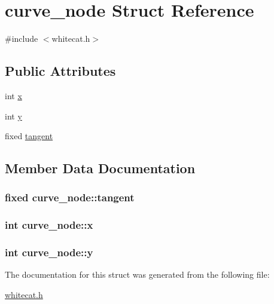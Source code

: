 \hypertarget{structcurve__node}{\section{curve\-\_\-node Struct Reference}
\label{structcurve__node}
}


{\ttfamily \#include $<$whitecat.\-h$>$}

\subsection*{Public Attributes}
\begin{DoxyCompactItemize}
\item 
int \hyperlink{structcurve__node_aa7ae8f2ee3bbd3e6194785c392751cdb}{x}
\item 
int \hyperlink{structcurve__node_afc1f4f007a920aa79c1f1f0ff0b49465}{y}
\item 
fixed \hyperlink{structcurve__node_a31ea7469070f7bb90ceae073d1d075a6}{tangent}
\end{DoxyCompactItemize}


\subsection{Member Data Documentation}
\hypertarget{structcurve__node_a31ea7469070f7bb90ceae073d1d075a6}{
\subsubsection[{tangent}]{\setlength{\rightskip}{0pt plus 5cm}fixed curve\-\_\-node\-::tangent}}\label{structcurve__node_a31ea7469070f7bb90ceae073d1d075a6}
\hypertarget{structcurve__node_aa7ae8f2ee3bbd3e6194785c392751cdb}{
\subsubsection[{x}]{\setlength{\rightskip}{0pt plus 5cm}int curve\-\_\-node\-::x}}\label{structcurve__node_aa7ae8f2ee3bbd3e6194785c392751cdb}
\hypertarget{structcurve__node_afc1f4f007a920aa79c1f1f0ff0b49465}{
\subsubsection[{y}]{\setlength{\rightskip}{0pt plus 5cm}int curve\-\_\-node\-::y}}\label{structcurve__node_afc1f4f007a920aa79c1f1f0ff0b49465}


The documentation for this struct was generated from the following file\-:\begin{DoxyCompactItemize}
\item 
\hyperlink{whitecat_8h}{whitecat.\-h}\end{DoxyCompactItemize}
